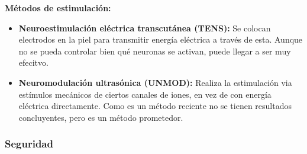 \documentclass[12pt, letterpaper]{article}
\begin{document}
\textbf{Métodos de estimulación:}
\begin{itemize}
    \item \textbf{Neuroestimulación eléctrica transcutánea (TENS):} Se colocan electrodos en la piel para transmitir energía eléctrica a través de esta. Aunque no se pueda controlar bien qué neuronas se activan, puede llegar a ser muy efecitvo.
    \item \textbf{Neuromodulación ultrasónica (UNMOD):} Realiza la estimulación via estímulos mecánicos de ciertos canales de iones, en vez de con energía eléctrica directamente. Como es un método reciente no se tienen resultados concluyentes, pero es un método prometedor.
\end{itemize}

\subsubsection{Seguridad}
\end{document}
